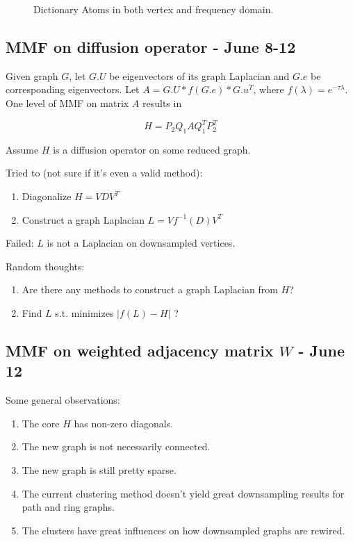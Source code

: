 \documentclass[a4paper]{article}
\begin{document}
\begin{figure}[H]
\caption{\label{fig:sensor net} Dictionary Atoms in both vertex and frequency domain.}
\end{figure}




\subsection{MMF on diffusion operator - June 8-12}
Given graph $G$, let $G.U$ be eigenvectors of its graph Laplacian and $G.e$ be corresponding eigenvectors. Let $A = G.U*f(G.e)*G.u^T$, where $f(\lambda) = e^{-\tau\lambda}$. One level of MMF on matrix $A$ results in

$$H = P_2Q_1AQ_1^TP_2^T$$

Assume $H$ is a diffusion operator on some reduced graph. 

Tried to (not sure if it's even a valid method):

\begin{enumerate}
\item Diagonalize $H = VDV^T$
\item Construct a graph Laplacian $L = Vf^{-1}(D)V^T$
\end{enumerate}

Failed: $L$ is not a Laplacian on downsampled vertices.

\smallskip
Random thoughts:
\begin{enumerate}
\item Are there any methods to construct a graph Laplacian from $H$? 
\item Find $L$ s.t. minimizes $|f(L) - H|$ ?
\end{enumerate}


\subsection{MMF on weighted adjacency matrix $W$ - June 12}
Some general observations:
\begin{enumerate}
\item The core $H$ has non-zero diagonals.
\item The new graph is not necessarily connected.
\item The new graph is still pretty sparse.

\item The current clustering method doesn't yield great downsampling results for path and ring graphs. 

\item The clusters have great influences on how downsampled graphs are rewired.
\end{enumerate}
\end{document}
